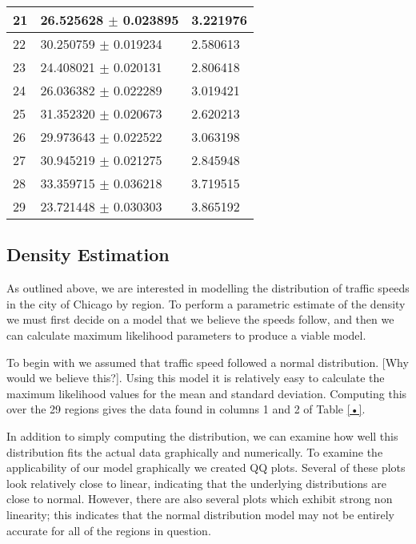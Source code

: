 \documentclass[12pt]{article}
\begin{document}
\begin{multicols*}{2}
\begin{table}
\begin{tabular}{|l|l|l|}
21 & 26.525628 $\pm$ 0.023895 & 3.221976\\\hline
22 & 30.250759 $\pm$ 0.019234 & 2.580613\\\hline
23 & 24.408021 $\pm$ 0.020131 & 2.806418\\\hline
24 & 26.036382 $\pm$ 0.022289 & 3.019421\\\hline
25 & 31.352320 $\pm$ 0.020673 & 2.620213\\\hline
26 & 29.973643 $\pm$ 0.022522 & 3.063198\\\hline
27 & 30.945219 $\pm$ 0.021275 & 2.845948\\\hline
28 & 33.359715 $\pm$ 0.036218 & 3.719515\\\hline
29 & 23.721448 $\pm$ 0.030303 & 3.865192\\\hline
\end{tabular}
\end{table}
\subsection{Density Estimation}
As outlined above, we are interested in modelling the distribution of traffic speeds in the city of Chicago by region. To perform a parametric estimate of the density we must first decide on a model that we believe the speeds follow, and then we can calculate maximum likelihood parameters to produce a viable model.

To begin with we assumed that traffic speed followed a normal distribution. [Why would we believe this?]. Using this model it is relatively easy to calculate the maximum likelihood values for the mean and standard deviation. Computing this over the 29 regions gives the data found in columns 1 and 2 of Table \ref{•}.

In addition to simply computing the distribution, we can examine how well this distribution fits the actual data graphically and numerically. To examine the applicability of our model graphically we created QQ plots. Several of these plots look relatively close to linear, indicating that the underlying distributions are close to normal. However, there are also several plots which exhibit strong non linearity; this indicates that the normal distribution model may not be entirely accurate for all of the regions in question.



\end{multicols*}
\end{document}
